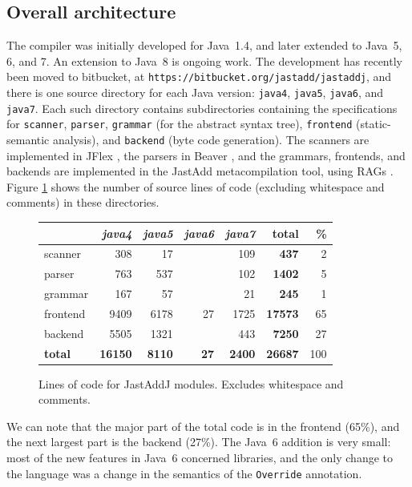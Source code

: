 {\subsection{Overall architecture}

The compiler was initially developed for Java~1.4, and later extended to Java~5, 6, and 7. An extension to Java~8 is ongoing work. The development has recently been moved to bitbucket, at \texttt{https://bitbucket.org/jastadd/jastaddj}, and there is one source directory for each Java version: \texttt{java4}, \texttt{java5}, \texttt{java6}, and \texttt{java7}. Each such directory contains subdirectories containing the specifications for \texttt{scanner}, \texttt{parser}, \texttt{grammar} (for the abstract syntax tree), \texttt{frontend} (static-semantic analysis), and \texttt{backend} (byte code generation). The scanners are implemented in JFlex \cite{jflex}, the parsers in Beaver \cite{beaver}, and the grammars, frontends, and backends are implemented in the JastAdd metacompilation tool, using RAGs \cite{jastadd}. Figure \ref{JastAddJLOCs} shows the number of source lines of code (excluding whitespace and comments) in these directories.

\begin{figure}
\center
\small
\begin{tabular}{ | l | r | r | r | r || r | r |}
\hline
  & \emph{java4} & \emph{java5} & \emph{java6} & \emph{java7}& \textbf{total} & \textbf{\%}\\
  \hline
  scanner & 308 & 17 &  & 109 & \textbf{437} & 2\\
  \hline
  parser & 763 & 537 &  & 102 &\textbf{1402} & 5\\
  \hline
  grammar & 167 & 57 &  & 21 &\textbf{245} & 1\\
  \hline
  frontend & 9409 & 6178 & 27 & 1725 &\textbf{17573} & 65\\
  \hline
  backend & 5505 & 1321 &  & 443 &\textbf{7250} & 27\\
  \hline
  \hline
  \textbf{total} & \textbf{16150} & \textbf{8110} & \textbf{27}& \textbf{2400}&\textbf{26687} & 100\\
  \hline
\end{tabular}
\caption{Lines of code for JastAddJ modules. Excludes whitespace and comments.}
\label{JastAddJLOCs}
\end{figure}


We can note that the major part of the total code is in the frontend  (65\%),
and the next largest part is the backend (27\%). The Java~6 addition is very
small: most of the new features in Java~6 concerned libraries, and the only
change to the language was a change in the semantics of the \texttt{Override}
annotation.

}
